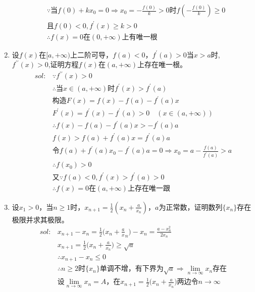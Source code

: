 \begin{enumerate}[{例}1.]
\begin{align*}
                &\because\mbox{当}f(0)+kx_0=0\Rightarrow x_0=-\frac{f(0)}{k}>0\mbox{时}f(-\frac{f(0)}{k})\geq 0\\
                &\mbox{且}f(0)<0,f^{\prime}(x)\geq k>0\\
                &\therefore f(x)=0\mbox{在}(0,+\infty)\mbox{上有唯一根}
        \end{align*}
    \item 设$f(x)$在$[a,+\infty)$上二阶可导，$f(a)<0$，$f^\prime(a)>0$当$x>a$时,$f^{\prime\prime}(x)>0$,证明方程$f(x)$在$(a,+\infty)$上存在唯一根。
        \begin{align*}
            sol:&\because f^{\prime\prime}(x)>0\\
                &\therefore \mbox{当}x\in (a,+\infty)\mbox{时}f^{\prime}(x)>f^{\prime}(a)\\
                &\mbox{构造}F(x)=f(x)-f(a)-f^{\prime}(a)x\\
                &F^{\prime}(x)=f^{\prime}(x)-f^{\prime}(a)>0\quad(x\in(a,+\infty))\\
                &\therefore f(x)-f(a)-f^{\prime}(a)x>-f^{\prime}(a)a\\
                &f(x)>f(a)+f^{\prime}(a)x=f^{\prime}(a)a\\
                &\mbox{令}f(a)+f^{\prime}(a)x_0-f^{\prime}(a)a=0\Rightarrow x_0=a-\frac{f(a)}{f^{\prime}(a)}>a\\
                &\therefore f(x_0)>0\\
                &\mbox{又}\because f(a)<0,f^{\prime}(x)>f^{\prime}(a)>0\\
                &\therefore f(x)=0\mbox{在}(a,+\infty)\mbox{上存在唯一跟}
        \end{align*}
    \item 设$x_1>0$，当$n\geq1$时，$x_{n+1}=\frac{1}{2}(x_n+\frac{a}{x_n})$，$a$为正常数，证明数列$\{x_n\}$存在极限并求其极限。
        \begin{align*}
            sol:&x_{n+1}-x_n=\frac{1}{2}\Big(x_n+\frac{a}x_n\Big)-x_n=\frac{a-x_n ^2}{2x_n}\\
                &x_{n+1}=\frac{1}{2}\Big(x_n+\frac{a}{x_n}\Big)\geq \sqrt{a}\\
                &\therefore x_{n+1}-x_n\leq 0\\
                &\therefore n\geq 2\mbox{时}\{x_n\}\mbox{单调不增，有下界为}\sqrt{a}\Rightarrow \lim_{n \to \infty}x_n\mbox{存在}\\
                &\mbox{设}\lim_{n \to \infty}x_n=A\mbox{，在}x_{n+1}=\frac{1}{2}\Big(x_n+\frac{a}{x_n}\Big)\mbox{两边令}n\to \infty\\

\end{align*}
\end{enumerate}
